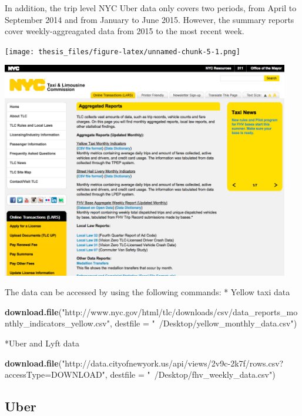 \documentclass[12pt,twoside]{reedthesis}
\newenvironment{Shaded}{\begin{snugshade}}{\end{snugshade}}
\newcommand{\KeywordTok}[1]{\textcolor[rgb]{0.13,0.29,0.53}{\textbf{#1}}}
\newcommand{\DataTypeTok}[1]{\textcolor[rgb]{0.13,0.29,0.53}{#1}}
\newcommand{\StringTok}[1]{\textcolor[rgb]{0.31,0.60,0.02}{#1}}
\newcommand{\NormalTok}[1]{#1}
\theoremstyle{definition}
\theoremstyle{definition}
\theoremstyle{definition}
\theoremstyle{remark}
\begin{document}
In addition, the trip level NYC Uber data only covers two periods, from
April to September 2014 and from January to June 2015. However, the
summary reports cover weekly-aggreagated data from 2015 to the most
recent week.

\texttt{[image: thesis\_files/figure-latex/unnamed-chunk-5-1.png]}
\begin{center}\includegraphics[width=4.96in]{figure/a-report} \end{center}

The data can be accessed by using the following commands: * Yellow taxi
data
\begin{Shaded}
\begin{Highlighting}[]
\KeywordTok{download.file}\NormalTok{(}\StringTok{"http://www.nyc.gov/html/tlc/downloads/csv/data_reports_monthly_indicators_yellow.csv"}\NormalTok{, }
    \DataTypeTok{destfile =} \StringTok{"~/Desktop/yellow_monthly_data.csv"}\NormalTok{)}
\end{Highlighting}
\end{Shaded}
*Uber and Lyft data
\begin{Shaded}
\begin{Highlighting}[]
\KeywordTok{download.file}\NormalTok{(}\StringTok{"http://data.cityofnewyork.us/api/views/2v9c-2k7f/rows.csv?accessType=DOWNLOAD"}\NormalTok{, }
    \DataTypeTok{destfile =} \StringTok{"~/Desktop/fhv_weekly_data.csv"}\NormalTok{)}
\end{Highlighting}
\end{Shaded}
\subsection{Uber}\label{uber-1}
\end{document}

